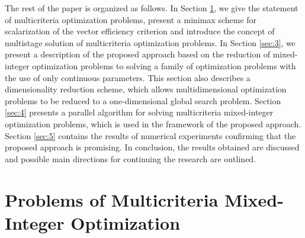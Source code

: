 \documentclass{svproc}
\begin{document}
The rest of the paper is organized as follows. In Section \ref{sec:2}, we give the statement of multicriteria optimization problems, present a minimax scheme for scalarization of the vector efficiency criterion and introduce the concept of multistage solution of multicriteria optimization problems. In Section \ref{sec:3}, we present a description of the proposed approach based on the reduction of mixed-integer optimization problems to solving a family of optimization problems with the use of only continuous parameters. This section also describes a dimensionality reduction scheme, which allows multidimensional optimization problems to be reduced to a one-dimensional global search problem. Section \ref{sec:4} presents a parallel algorithm for solving multicriteria mixed-integer optimization problems, which is used in the framework of the proposed approach. Section \ref{sec:5} contains the results of numerical experiments confirming that the proposed approach is promising. In conclusion, the results obtained are discussed and possible main directions for continuing the research are outlined.


\section{Problems of Multicriteria Mixed-Integer Optimization}\label{sec:2}
\end{document}
